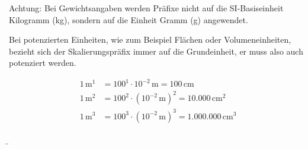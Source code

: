 \begin{frame}
{	Achtung: Bei Gewichtsangaben werden Präfixe nicht auf die SI-Basiseinheit Kilogramm
	(kg), sondern auf die Einheit Gramm (g) angewendet.

	Bei potenzierten Einheiten, wie zum Beispiel Flächen oder Volumeneinheiten, bezieht sich der
	 Skalierungspräfix immer auf die Grundeinheit, er muss also auch potenziert werden.

	 \begin{align*}
		1 \, \mathrm{m^1} &= 100^1 \cdot 10^{-2} \, \mathrm{m} = 100 \, \mathrm{cm} \\
		1 \, \mathrm{m^2} &= 100^2 \cdot (10^{-2} \, \mathrm{m})^2 = 10.000 \, \mathrm{cm^2} \\
		1 \, \mathrm{m^3} &= 100^3 \cdot (10^{-2} \, \mathrm{m})^3 = 1.000.000 \, \mathrm{cm^3}
	\end{align*}





	 

	

	}

	\b{
	\hspace{75pt}

	\hspace{75pt}

	\hspace{75pt}


	}


\end{frame}
